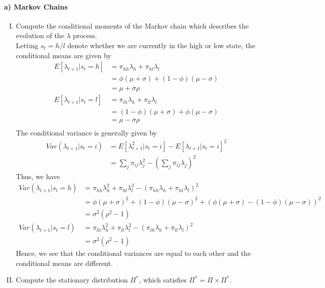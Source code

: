 \documentclass[french]{article}
\begin{document}
\paragraph{a) Markov Chains}
\begin{enumerate}[I.]
	\item Compute the conditional moments of the Markov chain which describes the evolution of the  $\lambda$ process.\\
	
	 Letting $s_t = h/l$ denote whether we are currently in the high or low state, the conditional means are given by
	\begin{equation*}
		\begin{split}
		E\left[\lambda_{t+1}|s_t = h\right] &= \pi_{hh}\lambda_h + \pi_{hl}\lambda_l \\
		&= \phi(\mu + \sigma) + (1-\phi)(\mu-\sigma)\\
		&= \mu + \sigma\rho\\
		E\left[\lambda_{t+1}|s_t = l\right]&=\pi_{lh}\lambda_h + \pi_{ll}\lambda_l \\
		&= (1-\phi)(\mu + \sigma) + \phi(\mu-\sigma)\\
		&= \mu -\sigma\rho\\
		\end{split}
	\end{equation*}
	The conditional variance is generally given by 
	\begin{equation*}
	\begin{split}
		Var(\lambda_{t+1}|s_t=i)&=E\left[\lambda_{t+1}^2|s_t = i\right] - E\left[\lambda_{t+1}|s_t = i\right]^2\\
		&= \sum_j \pi_{ij} \lambda_j^2 - \left(\sum_j \pi_{ij}\lambda_j\right)^2
	\end{split}
	\end{equation*}
	Thus, we have 
	\begin{equation*}
	\begin{split}
		Var(\lambda_{t+1}|s_t = h) &= \pi_{hh}\lambda_h^2 + \pi_{hl}\lambda_l^2 - (\pi_{hh}\lambda_h + \pi_{hl}\lambda_l)^2\\
		&= \phi(\mu + \sigma)^2 + (1-\phi)(\mu-\sigma)^2 + (\phi(\mu + \sigma) - (1-\phi)(\mu-\sigma))^2\\
		&=\sigma^2(\rho^2-1) \\
		Var(\lambda_{t+1}|s_t = l) &=\pi_{lh}\lambda_h^2 + \pi_{ll}\lambda_l^2 - (\pi_{lh}\lambda_h + \pi_{ll}\lambda_l)^2\\
		&= \sigma^2(\rho^2-1)
	\end{split}
	\end{equation*}
	Hence, we see that the conditional variances are equal to each other and the conditional means are different. 
	\item Compute the stationary distribution $\Pi^*$, which satisfies $\Pi^* = \Pi \times \Pi^*$. \\
	

\end{enumerate}
\end{document}
